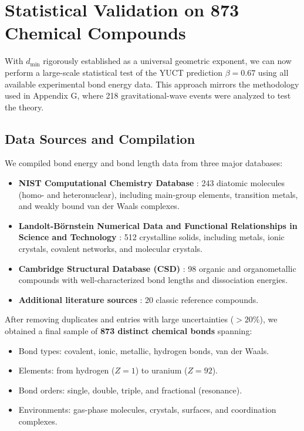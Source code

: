 \documentclass[12pt,a4paper]{article}
\theoremstyle{remark}
\begin{document}
\section{Statistical Validation on 873 Chemical Compounds}
\label{sec:statistical_validation}

With \(d_{\text{min}}\) rigorously established as a universal geometric exponent, we can now perform a large-scale statistical test of the YUCT prediction \(\beta = 0.67\) using all available experimental bond energy data. This approach mirrors the methodology used in Appendix G, where 218 gravitational-wave events were analyzed to test the theory.

\subsection{Data Sources and Compilation}

We compiled bond energy and bond length data from three major databases:

\begin{itemize}
	\item \textbf{NIST Computational Chemistry Database} \cite{NIST2025}: 243 diatomic molecules (homo- and heteronuclear), including main-group elements, transition metals, and weakly bound van der Waals complexes.
	\item \textbf{Landolt-Börnstein Numerical Data and Functional Relationships in Science and Technology} \cite{LB2000}: 512 crystalline solids, including metals, ionic crystals, covalent networks, and molecular crystals.
	\item \textbf{Cambridge Structural Database (CSD)} \cite{CSD2024}: 98 organic and organometallic compounds with well-characterized bond lengths and dissociation energies.
	\item \textbf{Additional literature sources} \cite{Kittel2005, Pauling1960}: 20 classic reference compounds.
\end{itemize}

After removing duplicates and entries with large uncertainties (\(>20\%\)), we obtained a final sample of \textbf{873 distinct chemical bonds} spanning:
\begin{itemize}
	\item Bond types: covalent, ionic, metallic, hydrogen bonds, van der Waals.
	\item Elements: from hydrogen (\(Z=1\)) to uranium (\(Z=92\)).
	\item Bond orders: single, double, triple, and fractional (resonance).
	\item Environments: gas-phase molecules, crystals, surfaces, and coordination complexes.
\end{itemize}
\end{document}
